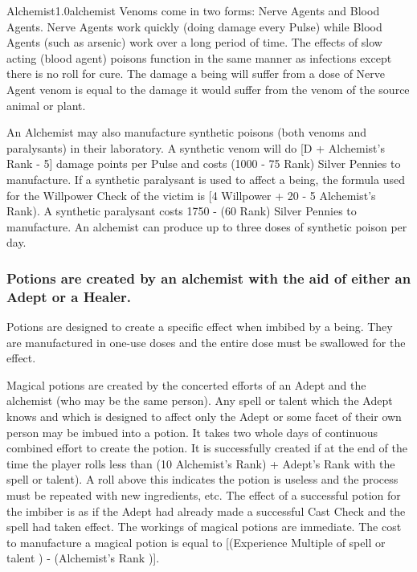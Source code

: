 \begin{skill}{Alchemist}{1.0}{alchemist}
Venoms come in two forms: Nerve Agents and Blood Agents.  Nerve Agents
work quickly (doing damage every Pulse) while Blood Agents (such as
arsenic) work over a long period of time.  The effects of slow acting
(blood agent) poisons function in the same manner as infections except
there is no roll for cure. The damage a being will suffer from a dose
of Nerve Agent venom is equal to the damage it would suffer from the
venom of the source animal or plant.

An Alchemist may also manufacture synthetic poisons (both venoms and
paralysants) in their laboratory. A synthetic venom will do [D +
Alchemist's Rank - 5] damage points per Pulse and costs (1000 - 75
\x Rank) Silver Pennies to manufacture.  If a synthetic
paralysant is used to affect a being, the formula used for the
Willpower Check of the victim is [4 \x Willpower + 20 - 5 \x
Alchemist's Rank).  A synthetic paralysant costs 1750 - (60 \x Rank)
Silver Pennies to manufacture.  An alchemist can produce up to three
doses of synthetic poison per day.

\subsubsection{Potions are created by an alchemist with the aid of
either an Adept or a Healer.}
\label{alchemist:potions}


Potions are designed to create a specific effect when imbibed by a
being.  They are manufactured in one-use doses and the entire dose
must be swallowed for the effect.

Magical potions are created by the concerted efforts of an Adept and
the alchemist (who may be the same person).  Any spell or talent which
the Adept knows and which is designed to affect only the Adept or some
facet of their own person may be imbued into a potion. It takes two
whole days of continuous combined effort to create the potion.  It is
successfully created if at the end of the time the player rolls less
than (10 \x Alchemist's Rank) + Adept's Rank with the spell or
talent).  A roll above this indicates the potion is useless and the
process must be repeated with new ingredients, etc.  The effect of a
successful potion for the imbiber is as if the Adept had already made
a successful Cast Check and the spell had taken effect.  The workings
of magical potions are immediate.  The cost to manufacture a magical
potion is equal to [(Experience Multiple of spell or talent ) -
(Alchemist's Rank )].


\end{skill}
